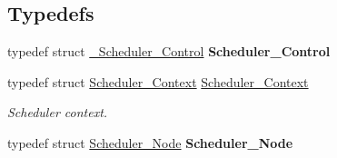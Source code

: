 \subsection*{Typedefs}
\begin{DoxyCompactItemize}
\item 
\mbox{\label{group__RTEMSScoreScheduler_ga82fbc2fbda82e50d2b17e97a9f3dd6dd}} 
typedef struct \mbox{\hyperlink{struct__Scheduler__Control}{\+\_\+\+Scheduler\+\_\+\+Control}} {\bfseries Scheduler\+\_\+\+Control}
\item 
typedef struct \mbox{\hyperlink{structScheduler__Context}{Scheduler\+\_\+\+Context}} \mbox{\hyperlink{group__RTEMSScoreScheduler_ga812fbe4a2e25d974a05d8d457cc62698}{Scheduler\+\_\+\+Context}}
\begin{DoxyCompactList}\small\item\em Scheduler context. \end{DoxyCompactList}\item 
\mbox{\label{group__RTEMSScoreScheduler_ga57dcfe0738f20a18ffdc79de872307bc}} 
typedef struct \mbox{\hyperlink{structScheduler__Node}{Scheduler\+\_\+\+Node}} {\bfseries Scheduler\+\_\+\+Node}
\end{DoxyCompactItemize}
